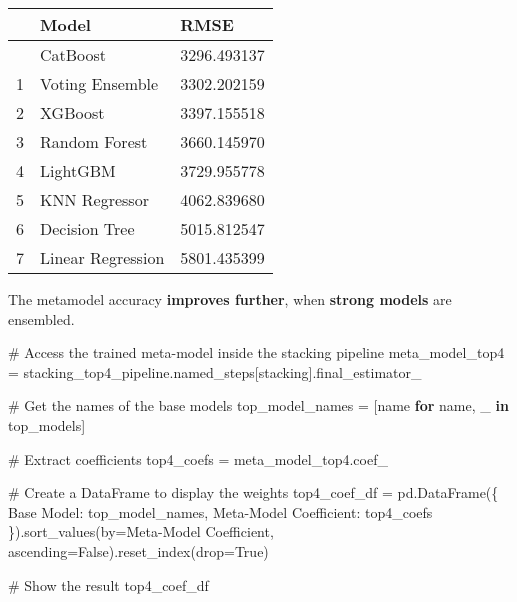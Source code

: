 \documentclass[
  letterpaper,
  DIV=11,
  numbers=noendperiod]{scrreprt}
\newenvironment{Shaded}{\begin{snugshade}}{\end{snugshade}}
\newcommand{\CommentTok}[1]{\textcolor[rgb]{0.37,0.37,0.37}{#1}}
\newcommand{\ControlFlowTok}[1]{\textcolor[rgb]{0.00,0.23,0.31}{\textbf{#1}}}
\newcommand{\KeywordTok}[1]{\textcolor[rgb]{0.00,0.23,0.31}{\textbf{#1}}}
\newcommand{\NormalTok}[1]{\textcolor[rgb]{0.00,0.23,0.31}{#1}}
\newcommand{\OperatorTok}[1]{\textcolor[rgb]{0.37,0.37,0.37}{#1}}
\newcommand{\StringTok}[1]{\textcolor[rgb]{0.13,0.47,0.30}{#1}}
\newcommand{\VariableTok}[1]{\textcolor[rgb]{0.07,0.07,0.07}{#1}}
\begin{document}
\begin{longtable}[]{@{}lll@{}}
\toprule\noalign{}
& Model & RMSE \\
\midrule\noalign{}
\endhead
\bottomrule\noalign{}
\endlastfoot
0 & CatBoost & 3296.493137 \\
1 & Voting Ensemble & 3302.202159 \\
2 & XGBoost & 3397.155518 \\
3 & Random Forest & 3660.145970 \\
4 & LightGBM & 3729.955778 \\
5 & KNN Regressor & 4062.839680 \\
6 & Decision Tree & 5015.812547 \\
7 & Linear Regression & 5801.435399 \\
\end{longtable}

The metamodel accuracy \textbf{improves further}, when \textbf{strong
models} are ensembled.

\begin{Shaded}
\begin{Highlighting}[]
\CommentTok{\# Access the trained meta{-}model inside the stacking pipeline}
\NormalTok{meta\_model\_top4 }\OperatorTok{=}\NormalTok{ stacking\_top4\_pipeline.named\_steps[}\StringTok{\textquotesingle{}stacking\textquotesingle{}}\NormalTok{].final\_estimator\_}

\CommentTok{\# Get the names of the base models}
\NormalTok{top\_model\_names }\OperatorTok{=}\NormalTok{ [name }\ControlFlowTok{for}\NormalTok{ name, \_ }\KeywordTok{in}\NormalTok{ top\_models]}

\CommentTok{\# Extract coefficients}
\NormalTok{top4\_coefs }\OperatorTok{=}\NormalTok{ meta\_model\_top4.coef\_}

\CommentTok{\# Create a DataFrame to display the weights}
\NormalTok{top4\_coef\_df }\OperatorTok{=}\NormalTok{ pd.DataFrame(\{}
    \StringTok{\textquotesingle{}Base Model\textquotesingle{}}\NormalTok{: top\_model\_names,}
    \StringTok{\textquotesingle{}Meta{-}Model Coefficient\textquotesingle{}}\NormalTok{: top4\_coefs}
\NormalTok{\}).sort\_values(by}\OperatorTok{=}\StringTok{\textquotesingle{}Meta{-}Model Coefficient\textquotesingle{}}\NormalTok{, ascending}\OperatorTok{=}\VariableTok{False}\NormalTok{).reset\_index(drop}\OperatorTok{=}\VariableTok{True}\NormalTok{)}

\CommentTok{\# Show the result}
\NormalTok{top4\_coef\_df}
\end{Highlighting}
\end{Shaded}
\end{document}
